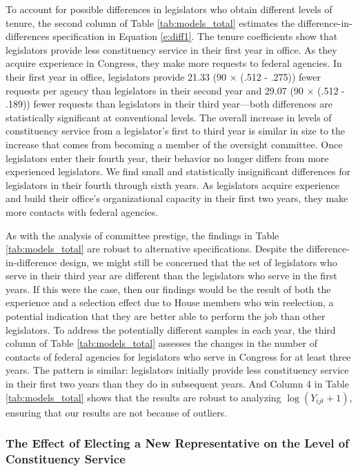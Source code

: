 \documentclass[12pt]{article}
\begin{document}
To account for possible differences in legislators who obtain different levels of tenure, the second column of Table \ref{tab:models_total} estimates the difference-in-differences specification in Equation \ref{e:diff1}. The tenure coefficients show that legislators provide less constituency service in their first year in office. As they acquire experience in Congress, they make more requests to federal agencies. In their first year in office, legislators provide 21.33 (90 $\times$ (.512 - .275)) fewer requests per agency than legislators in their second year and 29.07 (90 $\times$ (.512 - .189)) fewer requests than legislators in their third year---both differences are statistically significant at conventional levels. The overall increase in levels of constituency service from a legislator's first to third year is similar in size to the increase that comes from becoming a member of the oversight committee. Once legislators enter their fourth year, their behavior no longer differs from more experienced legislators. We find small and statistically insignificant differences for legislators in their fourth through sixth years. As legislators acquire experience and build their office's organizational capacity in their first two years, they make more contacts with federal agencies.  

As with the analysis of committee prestige, the findings in Table \ref{tab:models_total} are robust to alternative specifications. Despite the difference-in-difference design, we might still be concerned that the set of legislators who serve in their third year are different than the legislators who serve in the first years. If this were the case, then our findings would be the result of both the experience and a selection effect due to House members who win reelection, a potential indication that they are better able to perform the job than other legislators. To address the potentially different samples in each year, the third column of Table \ref{tab:models_total} assesses the changes in the number of contacts of federal agencies for legislators who serve in Congress for at least three years. The pattern is similar: legislators initially provide less constituency service in their first two years than they do in subsequent years. And Column 4 in Table \ref{tab:models_total} shows that the results are robust to analyzing $\log(Y_{ijt} + 1)$, ensuring that our results are not because of outliers.  

\subsubsection{The Effect of Electing a New Representative on the Level of Constituency Service}\label{s:tenure_dist}
\end{document}
